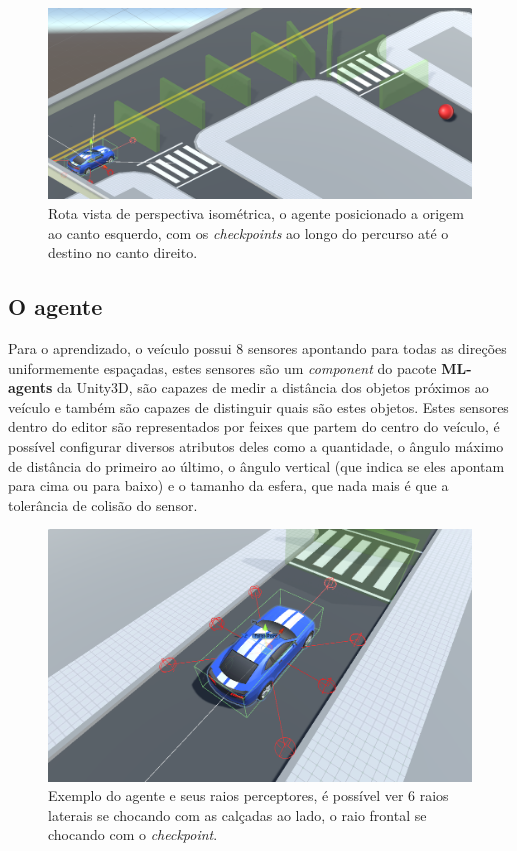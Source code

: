 \begin{figure}[h]
   \centering
   \includegraphics[scale=0.35]{figs/detalhe-rota.png}
    \caption{Rota vista de perspectiva isométrica, o agente posicionado a origem ao canto esquerdo, com os \textit{checkpoints} ao longo do percurso até o destino no canto direito.}
    \label{fig:route-view}
 \end{figure}

 \subsection{O agente}\label{agent-subsection}
 Para o aprendizado, o veículo possui 8 sensores apontando para todas as direções uniformemente espaçadas, estes sensores são um \textit{component} do pacote \textbf{ML-agents} da Unity3D, são capazes de medir a distância dos objetos próximos ao veículo e também são capazes de distinguir quais são estes objetos. Estes sensores dentro do editor são representados por feixes que partem do centro do veículo, é possível configurar diversos atributos deles como a quantidade, o ângulo máximo de distância do primeiro ao último, o ângulo vertical (que indica se eles apontam para cima ou para baixo) e o tamanho da esfera, que nada mais é que a tolerância de colisão do sensor.

 \begin{figure}[h]
   \centering
   \includegraphics[scale=0.35]{figs/agente-raios-checkpoint.png}
    \caption{Exemplo do agente e seus raios perceptores, é possível ver 6 raios laterais se chocando com as calçadas ao lado, o raio frontal se chocando com o \textit{checkpoint}.}
    \label{fig:casting-rays}
 \end{figure}

